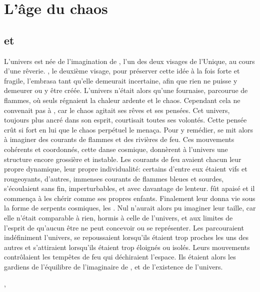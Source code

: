 \chapter{L'âge du chaos}


\section{\Mey et \Cind}

L'univers est née de l'imagination de \Mey, l'un des deux visages de l'Unique, au cours d'une rêverie. \Cind, le deuxième visage, pour préserver cette idée à la fois forte et fragile, l'embrasa tant qu'elle demeurait incertaine, afin que rien ne puisse y demeurer ou y être créée. L'univers n'était alors qu'une fournaise, parcourue de flammes, où seuls régnaient la chaleur ardente et le chaos. Cependant cela ne convenait pas à \Mey, car le chaos agitait ses rêves et ses pensées. Cet univers, toujours plus ancré dans son esprit, courtisait toutes ses volontés. Cette pensée crût si fort en lui que le chaos perpétuel le menaça. Pour y remédier, \Cind se mit alors à imaginer des courants de flammes et des rivières de feu. Ces mouvements cohérents et coordonnés, cette danse cosmique, donnèrent à l'univers une structure encore grossière et instable. Les courants de feu avaient chacun leur propre dynamique, leur propre individualité: certains d'entre eux étaient vifs et rougeoyants, d'autres, immenses courants de flammes bleues et sourdes, s'écoulaient sans fin, imperturbables, et avec davantage de lenteur. \Mey fût apaisé et il commença à les chérir comme ses propres enfants. Finalement \Mey leur donna vie sous la forme de serpents cosmiques, les \SerpentsCosmiques. Nul n'aurait alors pu imaginer leur taille, car elle n'était comparable à rien, hormis à celle de l'univers, et aux limites de l'esprit de \Mey qu'aucun être ne peut concevoir ou se représenter. Les \SerpentsCosmiques parcouraient indéfiniment l'univers, se repoussaient lorsqu'ils étaient trop proches les uns des autres et s'attiraient lorsqu'ils étaient trop éloignés ou isolés. Leurs mouvements contrôlaient les tempêtes de feu qui déchiraient l'espace. Ils étaient alors les gardiens de l'équilibre de l'imaginaire de \Mey, et de l'existence de l'univers.

,  

